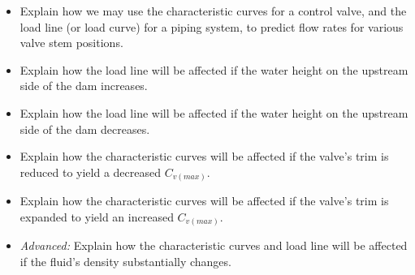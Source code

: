 \begin{itemize}
\item{} Explain how we may use the characteristic curves for a control valve, and the load line (or load curve) for a piping system, to predict flow rates for various valve stem positions.
\item{} Explain how the load line will be affected if the water height on the upstream side of the dam increases.
\item{} Explain how the load line will be affected if the water height on the upstream side of the dam decreases.
\item{} Explain how the characteristic curves will be affected if the valve's trim is reduced to yield a decreased $C_{v(max)}$.
\item{} Explain how the characteristic curves will be affected if the valve's trim is expanded to yield an increased $C_{v(max)}$.
\item{} {\it Advanced:} Explain how the characteristic curves and load line will be affected if the fluid's density substantially changes.
\end{itemize}




